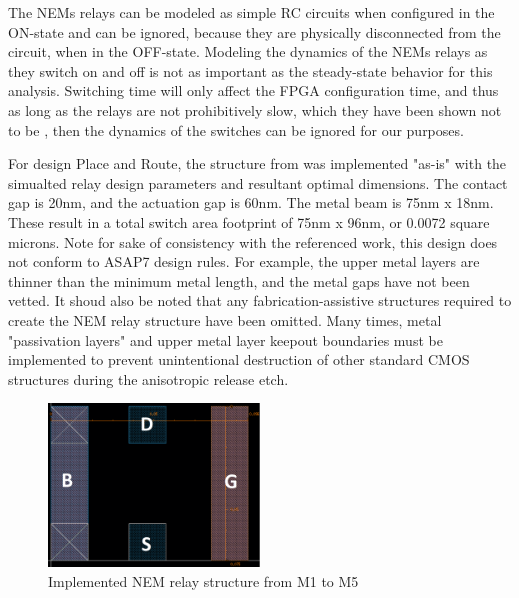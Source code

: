 \documentclass[twoside,twocolumn]{article}
\begin{document}
The NEMs relays can be modeled as simple RC circuits when configured in the 
ON-state \cite{chen_efficient_2010} \cite{chen_integrated_2008} and can be ignored, 
because they are physically disconnected from the 
circuit, when in the OFF-state. Modeling the dynamics of the NEMs relays
as they switch on and off is not as important as the steady-state behavior
for this analysis. Switching time will only affect the FPGA configuration
time, and thus as long as the relays are not prohibitively slow, which they
have been shown not to be \cite{chen_integrated_2008}, then the dynamics of the switches can be 
ignored for our purposes.


For design Place and Route, the structure from \cite{OLDSIKDER} was implemented "as-is" with the simualted relay design parameters and resultant optimal dimensions. The contact gap is 20nm, and the actuation gap is 60nm. The metal beam is 75nm x 18nm. These result in a total switch area footprint of 75nm x 96nm, or 0.0072 square microns.
Note for sake of consistency with the referenced work, this design does not conform to ASAP7 design rules. For example, the upper metal layers are thinner than the minimum metal length, and the metal gaps have not been vetted.
It shoud also be noted that any fabrication-assistive structures required to create the NEM relay structure have been omitted. Many times, metal "passivation layers" and upper metal layer keepout boundaries must be implemented to prevent unintentional destruction of other standard CMOS structures during the anisotropic release etch.

\begin{figure}[!hbt]
    \centering
    \caption{Implemented NEM relay structure from M1 to M5}
    \label{fig:methods}
    \includegraphics[width=0.5\textwidth]{figs/NEMlayout.png}
\end{figure}
\end{document}
